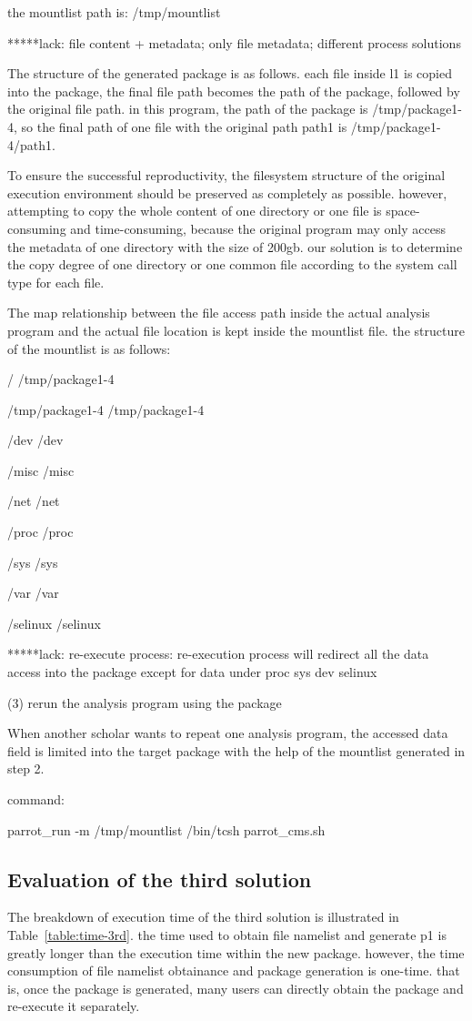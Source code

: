 \documentclass{acm_proc_article-sp}
\begin{document}
the mountlist path is: /tmp/mountlist

*****lack: file content + metadata; only file metadata; different process solutions

The structure of the generated package is as follows. each file inside l1 is copied into the package, the final file path becomes the path of the package, followed by the original file path. in this program, the path of the package is /tmp/package1-4, so the final path of one file with the original path path1 is /tmp/package1-4/path1.

To ensure the successful reproductivity, the filesystem structure of the original execution environment should be preserved as completely as possible. however, attempting to copy the whole content of one directory or one file is space-consuming and time-consuming, because the original program may only access the metadata of one directory with the size of 200gb. our solution is to determine the copy degree of one directory or one common file according to the system call type for each file.

The map relationship between the file access path inside the actual analysis program and the actual file location is kept inside the mountlist file. the structure of the mountlist is as follows:

/ /tmp/package1-4 

/tmp/package1-4 /tmp/package1-4 

/dev /dev 

/misc /misc 

/net /net 

/proc /proc 

/sys /sys 

/var /var 

/selinux /selinux

*****lack: re-execute process: re-execution process will redirect all the data access into the package except for data under proc sys dev selinux

(3) rerun the analysis program using the package

When another scholar wants to repeat one analysis program, the accessed data field is limited into the target package with the help of the mountlist generated in step 2. 

command:

parrot\_run -m /tmp/mountlist /bin/tcsh parrot\_cms.sh

\subsection{Evaluation of the third solution}
The breakdown of execution time of the third solution is illustrated in Table~\ref{table:time-3rd}. the time used to obtain file namelist and generate p1 is greatly longer than the execution time within the new package. however, the time consumption of file namelist obtainance and package generation is one-time. that is, once the package is generated, many users can directly obtain the package and re-execute it separately. 
\end{document}
